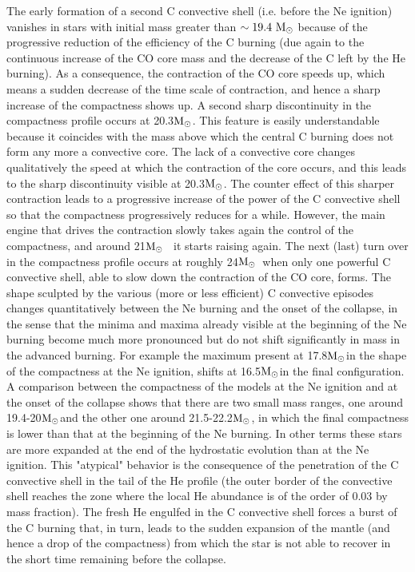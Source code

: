 \documentclass{aastex631}
\newcommand{\msun}{$\rm M_\odot$}
\begin{document}
The early formation of a second C convective shell (i.e. before the Ne ignition) vanishes in stars with initial mass greater than $\rm \sim 19.4~M_\odot$ because of the progressive reduction of the efficiency of the C burning (due again to the continuous increase of the CO core mass and the decrease of the C left by the He burning). As a consequence, the contraction of the CO core speeds up, which means a sudden decrease of the time scale of contraction, and hence a sharp increase of the compactness shows up. A second sharp discontinuity in the compactness profile occurs at 20.3\msun. This feature is easily understandable because it coincides with the mass above which the central C burning does not form any more a convective core. The lack of a convective core changes qualitatively the speed at which the contraction of the core occurs, and this leads to the sharp discontinuity visible at 20.3\msun. The counter effect of this sharper contraction leads to a progressive increase of the power of the C convective shell so that the compactness progressively reduces for a while. However, the main engine that drives the contraction slowly takes again the control of the compactness, and around 21\msun~ it starts raising again. The next (last) turn over in the compactness profile occurs at roughly 24\msun~when only one powerful C convective shell, able to slow down the contraction of the CO core, forms. The shape sculpted by the various (more or less efficient) C convective episodes changes quantitatively between the Ne burning and the onset of the collapse, in the sense that the minima and maxima already visible at the beginning of the Ne burning become much more pronounced but do not shift significantly in mass in the advanced burning. For example the maximum present at 17.8\msun in the shape of the compactness at the Ne ignition, shifts at 16.5\msun in the final configuration.
A comparison between the compactness of the models at the Ne ignition and at the onset of the collapse shows that there are two small mass ranges, one around 19.4-20\msun and the other one around 21.5-22.2\msun, in which the final compactness is lower than that at the beginning of the Ne burning. In other terms these stars are more expanded at the end of the hydrostatic evolution than at the Ne ignition. This "atypical" behavior is the consequence of the penetration of the C convective shell in the tail of the He profile (the outer border of the convective shell reaches the zone where the local He abundance is of the order of 0.03 by mass fraction). The fresh He engulfed in the C convective shell forces a burst of the C burning that, in turn, leads to the sudden expansion of the mantle (and hence a drop of the compactness) from which the star is not able to recover in the short time remaining before the collapse.
\end{document}
